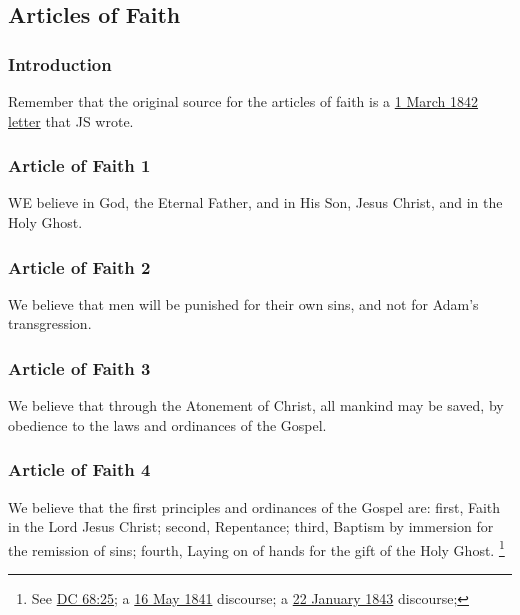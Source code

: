 \subsection{Articles of Faith}
	\label{ARTICLESOFFAITH}
	
	\subsubsection{Introduction}
	
		Remember that the original source for the articles of faith is a \hyperref[EMS-1842-JS-1-MAR-1842]{1 March 1842 letter} that JS wrote.
	
	\subsubsection{Article of Faith 1}
		\label{ARTICLESOFFAITH-1}
		
		WE believe in God, the Eternal Father, and in His Son, Jesus Christ, and in the Holy Ghost.
		
	\subsubsection{Article of Faith 2}
		\label{ARTICLESOFFAITH-2}
		
		We believe that men will be punished for their own sins, and not for Adam's transgression.
		
	\subsubsection{Article of Faith 3}
		\label{ARTICLESOFFAITH-3}
		
		We believe that through the Atonement of Christ, all mankind may be saved, by obedience to the laws and ordinances of the Gospel.
		
	\subsubsection{Article of Faith 4}
		\label{ARTICLESOFFAITH-4}
		
		We believe that the first principles and ordinances of the Gospel are: first, Faith in the Lord Jesus Christ; second, Repentance; third, Baptism by immersion for the remission of sins; fourth, Laying on of hands for the gift of the Holy Ghost.%
			\footnote{%
				See \hyperref[DC68-25]{DC 68:25}; a \hyperref[EMS-1841-JS-16-MAY-1841-TS]{16 May 1841} discourse; a \hyperref[EMS-1843-JS-22-JAN-1843-WC]{22 January 1843} discourse;
				}
		
